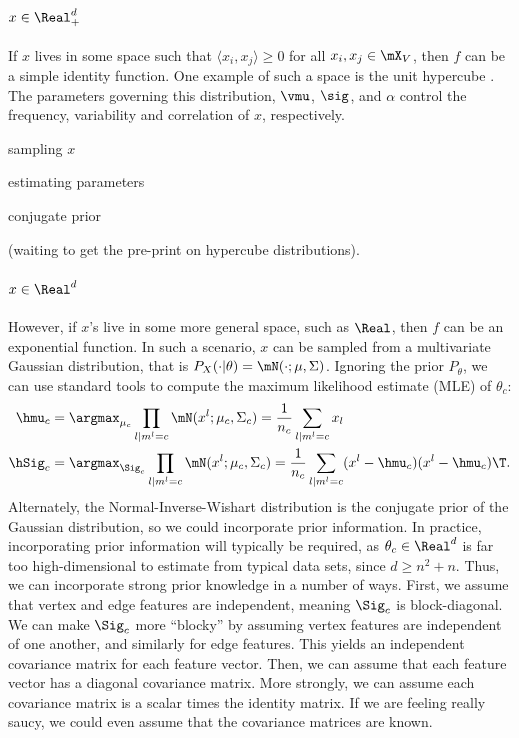 \paragraph{$x \in \Real^d_+$}

If $x$ lives in some space such that $\langle x_i, x_j \rangle \geq 0$ for all $x_i, x_j \in \mX_V$, then $f$ can be a simple identity function.  One example of such a space is the unit hypercube \cite{?}. The parameters governing this distribution, $\vmu$, $\sig$, and $\alpha$ control the frequency, variability and correlation of $x$, respectively. 

sampling $x$

estimating parameters

conjugate prior

(waiting to get the pre-print on hypercube distributions).  

\paragraph{$x \in \Real^d$}

However, if $x$'s live in some more general space, such as $\Real$, then $f$ can be an exponential function.  In such a scenario, $x$ can be sampled from a multivariate Gaussian distribution, that is $P_X( \cdot | \theta)=\mN(\cdot; \mu,\Sigma)$.  Ignoring the prior $P_{\theta}$, we can use standard tools to compute the maximum likelihood estimate (MLE) of $\theta_c$:
\begin{align}
	\hmu_c &= \argmax_{\mu_c} \prod_{l | m^l= c} \mN(x^l; \mu_c, \Sigma_c) = \frac{1}{n_c} \sum_{l | m^l = c} x_l \\
	\hSig_c &= \argmax_{\Sig_c} \prod_{l | m^l= c} \mN(x^l; \mu_c, \Sigma_c) =\frac{1}{n_c} \sum_{l | m^l=c} (x^l - \hmu_c) (x^l -\hmu_c)\T.
\end{align}
Alternately, the Normal-Inverse-Wishart distribution is the conjugate prior of the Gaussian distribution, so we could incorporate prior information. In practice, incorporating prior information will typically be required, as $\theta_c \in \Real^d$ is far too high-dimensional to estimate from typical data sets, since $d \geq n^2+n$.  Thus, we can incorporate strong prior knowledge in a number of ways.  First, we assume that vertex and edge features are independent, meaning $\Sig_c$ is block-diagonal.  We can make $\Sig_c$ more ``blocky'' by assuming vertex features are independent of one another, and similarly for edge features.  This yields an independent covariance matrix for each feature vector.  Then, we can assume that each feature vector has a diagonal covariance matrix. More strongly, we can assume each covariance matrix is a scalar times the identity matrix.  If we are feeling really saucy, we could even assume that the covariance matrices are known.  


